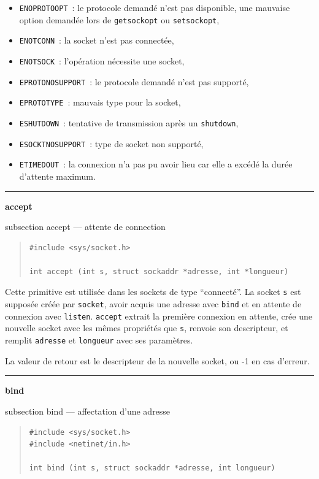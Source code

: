\documentclass [twoside] {report}
\newcommand {\primitive} [1]
    {
	\phantomsection
	{\large \textbf {#1}}
	\addcontentsline {toc} {subsection} {#1}
    }
\newcommand {\separation}
    {
	\vspace {5mm}
	\nopagebreak
	\hrule
    }
\begin{document}
\begin {itemize}
	demandé,
    \item \texttt {ENOPROTOOPT}~: le protocole demandé n'est pas
	disponible, une mauvaise option demandée lors de
	\texttt {getsockopt} ou \texttt {setsockopt},
    \item \texttt {ENOTCONN}~: la socket n'est pas connectée,
    \item \texttt {ENOTSOCK}~: l'opération nécessite une socket,
    \item \texttt {EPROTONOSUPPORT}~: le protocole demandé n'est pas
	supporté,
    \item \texttt {EPROTOTYPE}~: mauvais type pour la socket,
    \item \texttt {ESHUTDOWN}~: tentative de transmission après un
	\texttt {shutdown},
    \item \texttt {ESOCKTNOSUPPORT}~: type de socket non supporté,
    \item \texttt {ETIMEDOUT}~: la connexion n'a pas pu avoir lieu car elle
	a excédé la durée d'attente maximum.
\end {itemize}


\separation
\primitive {accept} --- attente de connection

\begin {quote}
\begin {verbatim}
#include <sys/socket.h>

int accept (int s, struct sockaddr *adresse, int *longueur)
\end{verbatim}
\end {quote}

Cette primitive est utilisée dans les sockets
de type ``connecté''. La socket \texttt {s} est supposée créée
par \texttt {socket}, avoir acquis une adresse avec \texttt {bind}
et en attente de connexion avec \texttt {listen}. \texttt {accept}
extrait la première connexion en attente, crée une nouvelle
socket avec les mêmes propriétés que \texttt {s}, renvoie son
descripteur, et remplit \texttt {adresse} et \texttt {longueur}
avec ses paramètres.

La valeur de retour est le descripteur de la nouvelle
socket, ou -1 en cas d'erreur.



\separation
\primitive {bind} --- affectation d'une adresse

\begin {quote}
\begin {verbatim}
#include <sys/socket.h>
#include <netinet/in.h>

int bind (int s, struct sockaddr *adresse, int longueur)
\end{verbatim}
\end {quote}
\end{document}
